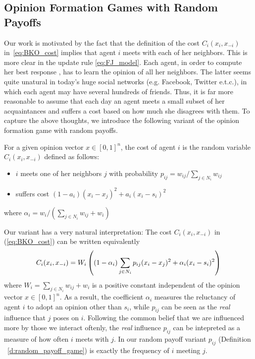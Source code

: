 \subsection{Opinion Formation Games with Random Payoffs}
Our work is motivated by the fact that the definition of the cost $C_i(x_i,x_{-i})$
in~\ref{eq:BKO_cost} implies that agent $i$ meets with each of her neighbors. This is more
clear in the update rule \ref{eq:FJ_model}. Each agent, in order to compute her best response
, has to learn the opinion of all her neighbors. The latter seems quite unatural in today's
huge social networks (e.g. Facebook, Twitter e.t.c.), in which each agent may have
several hundreds of friends. Thus, it is far more reasonable to assume
that each day an agent meets a small subset of her acquaintances and
suffers a cost based on how much she disagrees with them. To capture the above thoughts,
we introduce the following variant of the opinion formation game with random
payoffs.

\begin{definition}\label{d:random_payoff_game}
  For a given opinion vector $x \in [0,1]^n$, the cost of agent $i$
  is the random variable $C_i(x_i,x_{-i})$ defined as follows:
  \begin{itemize}
    \item $i$ meets one of her neighbors $j$ with probability $p_{ij}= w_{ij}/\sum_{j\in N_i}w_{ij}$
    \item suffers cost $(1-a_i)(x_i-x_j)^2 + a_i(x_i-s_i)^2$
  \end{itemize}
  where $\alpha_i = w_i/(\sum_{j\in N_i}w_{ij}+w_i)$
\end{definition}
\noindent Our variant has a very natural interpretation: The cost $C_i(x_i,x_{-i})$ in (\ref{eq:BKO_cost})
can be written equivalently
\begin{equation}\label{eq:BKO11_cost_equivalent}
C_i(x_i,x_{-i}) = W_i\left( (1-\alpha_i)\sum_{j \in N_i} p_{ij}(x_i-x_j)^2  + \alpha_i(x_i-s_i)^2\right)
\end{equation}
where $W_i=\sum_{j\in N_i}w_{ij} + w_i$ is a positive constant independent
 of the opinion vector $x\in [0,1]^n$. As a result, the coefficient $\alpha_i$
measures the reluctancy of agent $i$ to adopt an opinion other than $s_i$, while 
$p_{ij}$ can be seen as the \emph{real} influence that $j$ poses on $i$.
Following the common belief that we are influenced more by those we interact oftenly,
 the \emph{real} influence $p_{ij}$ can be intepreted as a measure of how
often $i$ meets with $j$. In our random payoff variant $p_{ij}$ 
(Definition ~\ref{d:random_payoff_game}) is exactly the frequency of $i$ meeting $j$. 

